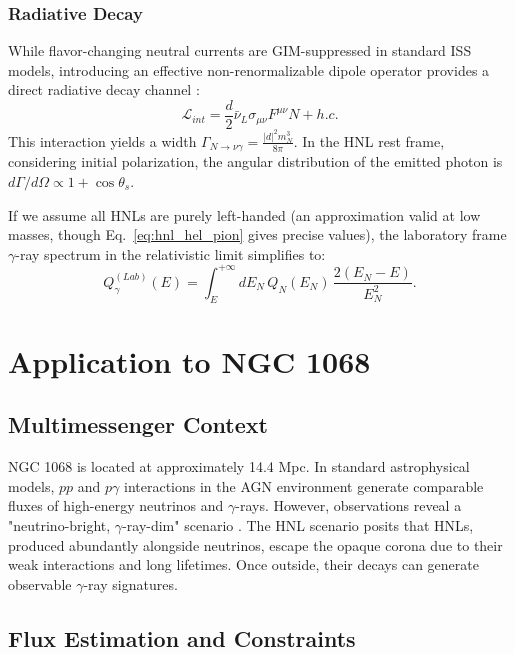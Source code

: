 \documentclass{article}
\begin{document}
\subsubsection{Radiative Decay}
While flavor-changing neutral currents are GIM-suppressed in standard ISS models, introducing an effective non-renormalizable dipole operator provides a direct radiative decay channel \cite{Magill_2018}:
\begin{equation}
  \mathcal{L}_{int} = \frac{d}{2} \bar{\nu}_L \sigma_{\mu \nu} F^{\mu \nu} N + h.c. \label{eq:int_mag_nu}
\end{equation}
This interaction yields a width $\Gamma_{N \to \nu \gamma} = \frac{|d|^2 m_N^3}{8 \pi}$. In the HNL rest frame, considering initial polarization, the angular distribution of the emitted photon is $d \Gamma / d \Omega \propto 1 + \cos{\theta_{s}}$.

If we assume all HNLs are purely left-handed (an approximation valid at low masses, though Eq.~\ref{eq:hnl_hel_pion} gives precise values), the laboratory frame $\gamma$-ray spectrum in the relativistic limit simplifies to:
\begin{equation}
  Q_\gamma^{(Lab)} (E) = \int_{E}^{+\infty}d E_N \, Q_N(E_N) \, \frac{2 (E_N - E)}{E_N^2}. \label{eq:pure_L_N_gamma}
\end{equation}

\section{Application to NGC 1068} \label{sec:application}

\subsection{Multimessenger Context}
NGC 1068 is located at approximately 14.4 Mpc. In standard astrophysical models, $pp$ and $p\gamma$ interactions in the AGN environment generate comparable fluxes of high-energy neutrinos and $\gamma$-rays. However, observations reveal a "neutrino-bright, $\gamma$-ray-dim" scenario \cite{murase2020hidden}. The HNL scenario posits that HNLs, produced abundantly alongside neutrinos, escape the opaque corona due to their weak interactions and long lifetimes. Once outside, their decays can generate observable $\gamma$-ray signatures.

\subsection{Flux Estimation and Constraints}
\end{document}
